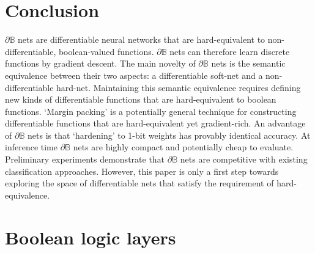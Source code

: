 \documentclass{article}
\theoremstyle{plain}
\theoremstyle{definition}
\theoremstyle{remark}
\begin{document}
\section{Conclusion}\label{sec:conclusion}

$\partial\mathbb{B}$ nets are differentiable neural networks that are hard-equivalent to non-differentiable, boolean-valued functions. $\partial\mathbb{B}$ nets can therefore learn discrete functions by gradient descent. The main novelty of $\partial\mathbb{B}$ nets is the semantic equivalence between their two aspects: a differentiable soft-net and a non-differentiable hard-net. Maintaining this semantic equivalence requires defining new kinds of differentiable functions that are hard-equivalent to boolean functions. `Margin packing' is a potentially general technique for constructing differentiable functions that are hard-equivalent yet gradient-rich. An advantage of $\partial\mathbb{B}$ nets is that `hardening' to 1-bit weights has provably identical accuracy. At inference time $\partial\mathbb{B}$ nets are highly compact and potentially cheap to evaluate. Preliminary experiments demonstrate that $\partial\mathbb{B}$ nets are competitive with existing classification approaches. However, this paper is only a first step towards exploring the space of differentiable nets that satisfy the requirement of hard-equivalence.







\newpage
\appendix
\onecolumn

\section{Boolean logic layers}\label{sec:layers}
\end{document}
